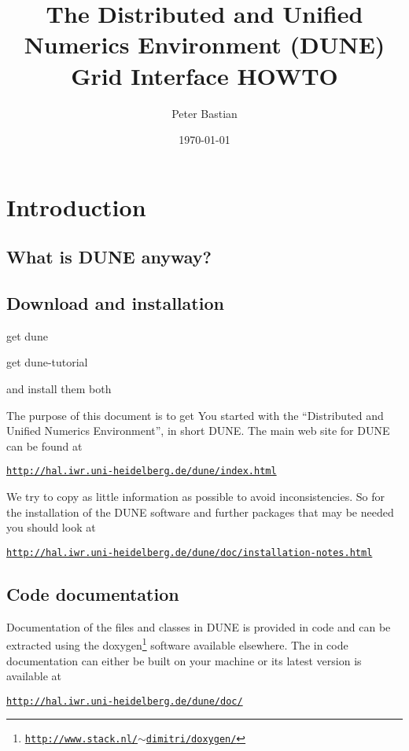 \documentclass[11pt,a4paper,headinclude,footinclude,DIV14,BCOR8.25mm,titlepage,twoside,openright,normalheadings]{scrreprt}
\title{The Distributed and Unified Numerics Environment (DUNE) Grid
  Interface HOWTO}
\author{Peter Bastian}
\date{\today}
\begin{document}
\maketitle

\tableofcontents
\cleardoublepage

\chapter{Introduction}

\section{What is DUNE anyway?}

\section{Download and installation}

get dune

get dune-tutorial

and install them both

The purpose of this document is to get You started with the
``Distributed and Unified Numerics Environment'', in short DUNE. The
main web site for DUNE can be found at
%
\begin{center}
\href{http://hal.iwr.uni-heidelberg.de/dune/index.html}%
{\texttt{http://hal.iwr.uni-heidelberg.de/dune/index.html}}
\end{center}
%
We try to copy as little information as possible to avoid
inconsistencies. So for the installation of the DUNE software and
further packages that may be needed you should look at
\begin{center}
\href{http://hal.iwr.uni-heidelberg.de/dune/doc/installation-notes.html}%
{\texttt{http://hal.iwr.uni-heidelberg.de/dune/doc/installation-notes.html}}
\end{center}

\section{Code documentation}

Documentation of the files and classes in DUNE is provided in code and
can be extracted using the
doxygen\footnote{\href{http://www.stack.nl/~dimitri/doxygen/}{\texttt{http://www.stack.nl/$\sim$dimitri/doxygen/}}}
software available elsewhere. The in code documentation can either be built
on your machine or its latest version is available at
\begin{center}
\href{http://hal.iwr.uni-heidelberg.de/dune/doc/}%
{\texttt{http://hal.iwr.uni-heidelberg.de/dune/doc/}}
\end{center}
\end{document}
